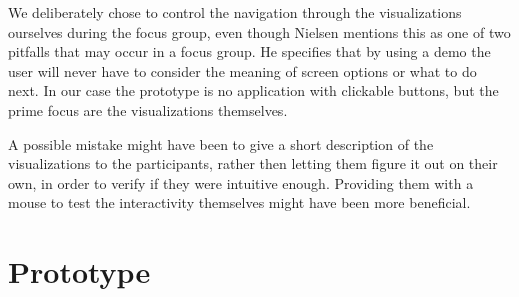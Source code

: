 We deliberately chose to control the navigation through the visualizations ourselves during the focus group, even though Nielsen mentions this as one of two pitfalls that may occur in a focus group. He specifies that by using a demo the user will never have to consider the meaning of screen options or what to do next. In our case the prototype is no application with clickable buttons, but the prime focus are the visualizations themselves. 

A possible mistake might have been to give a short description of the visualizations to the participants, rather then letting them figure it out on their own, in order to verify if they were intuitive enough. Providing them with a mouse to test the interactivity themselves might have been more beneficial.

\section{Prototype}
